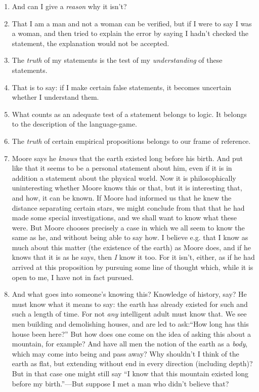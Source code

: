\documentclass{book}
\begin{document}
\begin{enumerate}
\item
And can I give a \emph{reason} why it isn't?

\item
That I am a man and not a woman can be verified, but if I were to say I was a
woman, and then tried to explain the error by saying I hadn't checked the
statement, the explanation would not be accepted.

\item
The \emph{truth} of my statements is the test of my \emph{understanding} of
these statements.

\item
That is to say: if I make certain false statements, it becomes uncertain
whether I understand them.

\item
What counts as an adequate test of a statement belongs to logic. It belongs to
the description of the language-game.

\item
The \emph{truth} of certain empirical propositions belongs to our frame of
reference.

\item
Moore says he \emph{knows} that the earth existed long before his birth. And
put like that it seems to be a personal statement about him, even if it is in
addition a statement about the physical world. Now it is philosophically
uninteresting whether Moore knows this or that, but it is interesting that, and
how, it can be known. If Moore had informed us that he knew the distance
separating certain stars, we might conclude from that that he had made some
special investigations, and we shall want to know what these were. But Moore
chooses precisely a case in which we all seem to know the same as he, and
without being able to say how. I believe e.g. that I know as much about this
matter (the existence of the earth) as Moore does, and if he knows that it is
as he says, then \emph{I} know it too. For it isn't, either, as if he had
arrived at this proposition by pursuing some line of thought which, while it is
open to me, I have not in fact pursued.

\item
And what goes into someone's knowing this? Knowledge of history, say? He must
know what it means to say: the earth has already existed for such and such a
length of time. For not \emph{any} intelligent adult must know that. We see men
building and demolishing houses, and are led to ask:``How long has this house
been here?'' But how does one come on the idea of asking this about a mountain,
for example? And have all men the notion of the earth as a \emph{body}, which
may come into being and pass away? Why shouldn't I think of the earth as flat,
but extending without end in every direction (including depth)? But in that
case one might still say ``I know that this mountain existed long before my
birth.''---But suppose I met a man who didn't believe that?


\end{enumerate}
\end{document}
